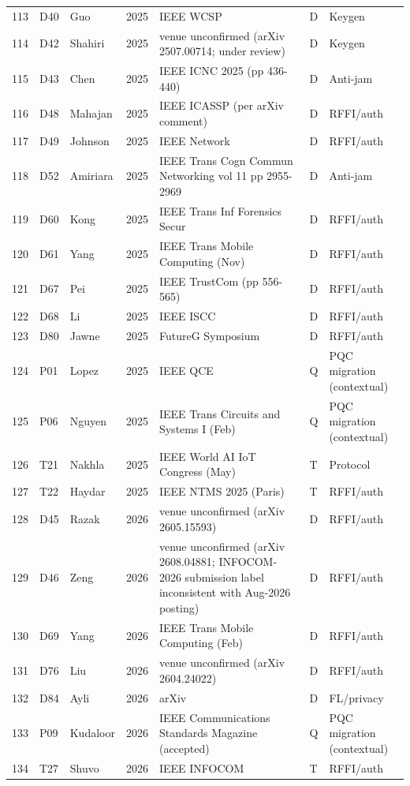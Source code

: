 \begin{table}[p]
\begin{tabular}{@{}lllll>{\raggedright\arraybackslash}p{3.3cm}>{\raggedright\arraybackslash}p{1.9cm}@{}}
113 & D40 & Guo & 2025 & IEEE WCSP & D & Keygen \\
114 & D42 & Shahiri & 2025 & venue unconfirmed (arXiv 2507.00714; under review) & D & Keygen \\
115 & D43 & Chen & 2025 & IEEE ICNC 2025 (pp 436-440) & D & Anti-jam \\
116 & D48 & Mahajan & 2025 & IEEE ICASSP (per arXiv comment) & D & RFFI/auth \\
117 & D49 & Johnson & 2025 & IEEE Network & D & RFFI/auth \\
118 & D52 & Amiriara & 2025 & IEEE Trans Cogn Commun Networking vol 11 pp 2955-2969 & D & Anti-jam \\
119 & D60 & Kong & 2025 & IEEE Trans Inf Forensics Secur & D & RFFI/auth \\
120 & D61 & Yang & 2025 & IEEE Trans Mobile Computing (Nov) & D & RFFI/auth \\
121 & D67 & Pei & 2025 & IEEE TrustCom (pp 556-565) & D & RFFI/auth \\
122 & D68 & Li & 2025 & IEEE ISCC & D & RFFI/auth \\
123 & D80 & Jawne & 2025 & FutureG Symposium & D & RFFI/auth \\
124 & P01 & Lopez & 2025 & IEEE QCE & Q & PQC migration (contextual) \\
125 & P06 & Nguyen & 2025 & IEEE Trans Circuits and Systems I (Feb) & Q & PQC migration (contextual) \\
126 & T21 & Nakhla & 2025 & IEEE World AI IoT Congress (May) & T & Protocol \\
127 & T22 & Haydar & 2025 & IEEE NTMS 2025 (Paris) & T & RFFI/auth \\
128 & D45 & Razak & 2026 & venue unconfirmed (arXiv 2605.15593) & D & RFFI/auth \\
129 & D46 & Zeng & 2026 & venue unconfirmed (arXiv 2608.04881; INFOCOM-2026 submission label inconsistent with Aug-2026 posting) & D & RFFI/auth \\
130 & D69 & Yang & 2026 & IEEE Trans Mobile Computing (Feb) & D & RFFI/auth \\
131 & D76 & Liu & 2026 & venue unconfirmed (arXiv 2604.24022) & D & RFFI/auth \\
132 & D84 & Ayli & 2026 & arXiv & D & FL/privacy \\
133 & P09 & Kudaloor & 2026 & IEEE Communications Standards Magazine (accepted) & Q & PQC migration (contextual) \\
134 & T27 & Shuvo & 2026 & IEEE INFOCOM & T & RFFI/auth \\\bottomrule
\end{tabular}
\end{table}
